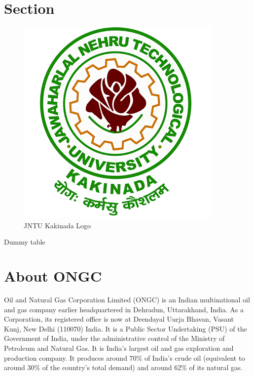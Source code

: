 \documentclass[11pt,a4paper]{article}
\makeatletter
\newcommand\mainmatter{%
    \cleardoublepage
  \pagenumbering{arabic}}
\makeatother
\begin{document}
\newpage


\listoftables


\newpage


\listoffigures


\newpage
\mainmatter

\section{Section}

\newpage
  

\begin{figure}
  \includegraphics[scale=0.5]{jntuk1}
  \caption{JNTU Kakinada Logo}
\end{figure}


\begin{table}
  \caption{Dummy table}
\end{table}

\newpage

\section{\textbf{About ONGC}}

Oil and Natural Gas Corporation Limited (ONGC) is an Indian multinational oil and gas company earlier headquartered in Dehradun, Uttarakhand, India. As a Corporation, its registered office is now at Deendayal Uurja Bhavan, Vasant Kunj, New Delhi (110070) India. It is a Public Sector Undertaking (PSU) of the
Government of India, under the administrative control of the Ministry of Petroleum and Natural Gas. It is India's largest oil and gas exploration and production company. It produces around 70\% of India's crude oil (equivalent to around 30\% of the country's total demand) and around 62\% of its natural gas.
\end{document}
